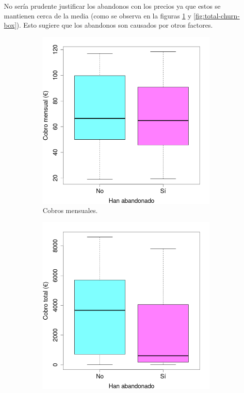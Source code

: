 \documentclass[10pt,a4paper, titlepage]{article}
\begin{document}
No sería prudente justificar los abandonos con los precios ya que estos se mantienen cerca de la media (como se observa en la figuras \ref{fig:month-churn-box} y \ref{fig:total-churn-box}). Esto sugiere que los abandonos son causados por otros factores.
\begin{figure}[!htb]
     \centering
     \begin{subfigure}[b]{0.4\textwidth}
         \centering
         \includegraphics[width=\textwidth]{month-churn-box}
         \caption{Cobros mensuales.}
		 \label{fig:month-churn-box}
	 \end{subfigure}\hspace{1cm}
     \begin{subfigure}[b]{0.4\textwidth}
         \centering
         \includegraphics[width=\textwidth]{total-churn-box}

\end{subfigure}
\end{figure}
\end{document}

